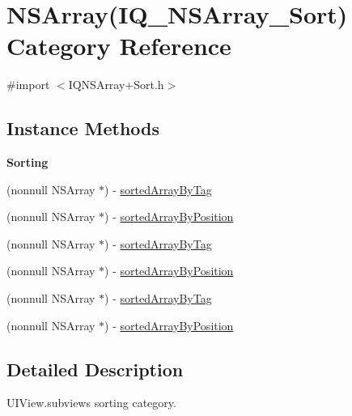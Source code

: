\hypertarget{category_n_s_array_07_i_q___n_s_array___sort_08}{}\section{N\+S\+Array(I\+Q\+\_\+\+N\+S\+Array\+\_\+\+Sort) Category Reference}
\label{category_n_s_array_07_i_q___n_s_array___sort_08}


{\ttfamily \#import $<$I\+Q\+N\+S\+Array+\+Sort.\+h$>$}

\subsection*{Instance Methods}
\begin{Indent}\textbf{ Sorting}\par
{\em 

 

 }\begin{DoxyCompactItemize}
\item 
(nonnull N\+S\+Array $\ast$) -\/ \mbox{\hyperlink{category_n_s_array_07_i_q___n_s_array___sort_08_ad3e22a71b19f3cfc9ec67af32a047a56}{sorted\+Array\+By\+Tag}}
\item 
(nonnull N\+S\+Array $\ast$) -\/ \mbox{\hyperlink{category_n_s_array_07_i_q___n_s_array___sort_08_a7e85c538c11b616312d175639017bd0b}{sorted\+Array\+By\+Position}}
\item 
(nonnull N\+S\+Array $\ast$) -\/ \mbox{\hyperlink{category_n_s_array_07_i_q___n_s_array___sort_08_a72511d078e1e94ab28b218bc84e2f560}{sorted\+Array\+By\+Tag}}
\item 
(nonnull N\+S\+Array $\ast$) -\/ \mbox{\hyperlink{category_n_s_array_07_i_q___n_s_array___sort_08_a1e18896d23f8c8fdfb2f66f25a00eced}{sorted\+Array\+By\+Position}}
\item 
(nonnull N\+S\+Array $\ast$) -\/ \mbox{\hyperlink{category_n_s_array_07_i_q___n_s_array___sort_08_a72511d078e1e94ab28b218bc84e2f560}{sorted\+Array\+By\+Tag}}
\item 
(nonnull N\+S\+Array $\ast$) -\/ \mbox{\hyperlink{category_n_s_array_07_i_q___n_s_array___sort_08_a1e18896d23f8c8fdfb2f66f25a00eced}{sorted\+Array\+By\+Position}}
\end{DoxyCompactItemize}
\end{Indent}


\subsection{Detailed Description}
U\+I\+View.\+subviews sorting category. 


